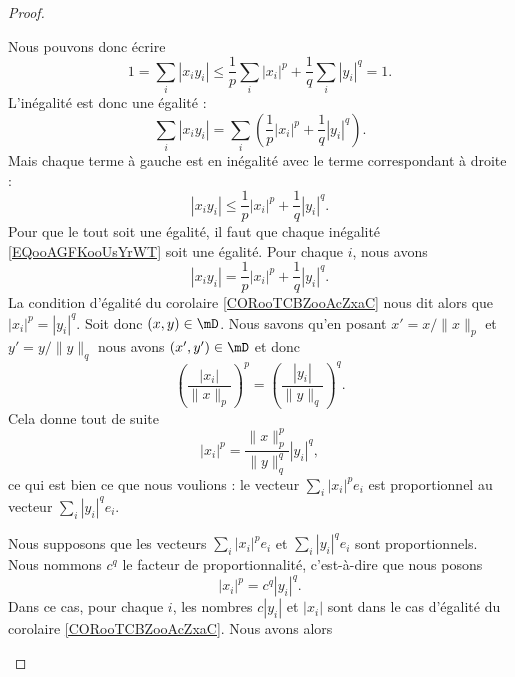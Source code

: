 \begin{proof}
\begin{subproof}
\begin{subproof}
			Nous pouvons donc écrire
			\begin{equation}
				1=\sum_i| x_iy_i |\leq \frac{1}{ p }\sum_i| x_i |^p+\frac{1}{ q }\sum_i| y_i |^q=1.
			\end{equation}
			L'inégalité est donc une égalité :
			\begin{equation}
				\sum_i| x_iy_i |=\sum_i\left( \frac{1}{ p }| x_i |^p+\frac{1}{ q }| y_i |^q \right).
			\end{equation}
			Mais chaque terme à gauche est en inégalité avec le terme correspondant à droite :
			\begin{equation}        \label{EQooAGFKooUsYrWT}
				| x_iy_i |\leq \frac{1}{ p }| x_i |^p+\frac{1}{ q }| y_i |^q.
			\end{equation}
			Pour que le tout soit une égalité, il faut que chaque inégalité \eqref{EQooAGFKooUsYrWT} soit une égalité. Pour chaque \( i\), nous avons
			\begin{equation}
				| x_iy_i |=\frac{1}{ p }| x_i |^p+\frac{1}{ q }| y_i |^q.
			\end{equation}
			La condition d'égalité du corolaire \ref{CORooTCBZooAcZxaC} nous dit alors que \( | x_i |^p=| y_i |^q\).
			Soit donc \( (x,y)\in \mD\). Nous savons qu'en posant \( x'=x/\| x \|_p\) et \( y'=y/\| y \|_q\) nous avons \( (x',y')\in \mD\) et donc
			\begin{equation}
				\left( \frac{ | x_i | }{ \| x \|_p } \right)^p=\left( \frac{ | y_i | }{ \| y \|_q } \right)^q.
			\end{equation}
			Cela donne tout de suite
			\begin{equation}
				| x_i |^p=\frac{ \| x \|_p^p }{ \| y \|_q^q }| y_i |^q,
			\end{equation}
			ce qui est bien ce que nous voulions : le vecteur \( \sum_i| x_i |^pe_i\) est proportionnel au vecteur \( \sum_i| y_i |^qe_i\).
		\end{subproof}
		Nous supposons que les vecteurs \( \sum_i| x_i |^pe_i\) et \( \sum_i| y_i |^qe_i\) sont proportionnels. Nous nommons \( c^q\) le facteur de proportionnalité, c'est-à-dire que nous posons
		\begin{equation}
			| x_i |^p=c^q| y_i |^q.
		\end{equation}
		Dans ce cas, pour chaque \( i\), les nombres \( c| y_i |\) et \( | x_i |\) sont dans le cas d'égalité du corolaire \ref{CORooTCBZooAcZxaC}. Nous avons alors
		\begin{subequations}        \label{SUBEQSooVULLooPGWUIP}

\end{subequations}
\end{subproof}
\end{proof}
